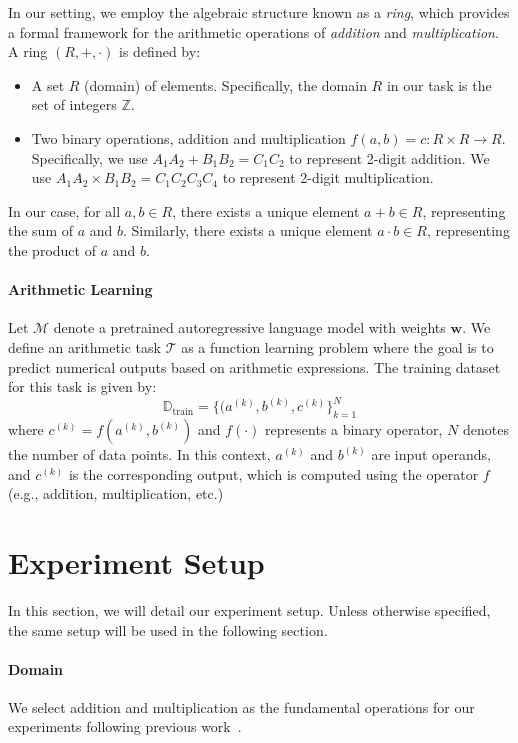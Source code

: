 \documentclass[11pt]{article}
\begin{document}
In our setting, we employ the algebraic structure known as a \textit{ring}, which provides a formal framework for the arithmetic operations of \textit{addition} and \textit{multiplication}. A ring $(R, +, \cdot)$ is defined by:

\begin{itemize}
    \item A set $R$ (domain) of elements. Specifically, the domain $R$ in our task is the set of integers $\mathbb{Z}$.
    \item Two binary operations, addition and multiplication $f(a,b)=c : R \times R \to R$. Specifically, we use $A_1A_2 + B_1B_2 = C_1C_2$ to represent 2-digit addition. We use $A_1A_2 \times B_1B_2 = C_1C_2C_3C_4$ to represent 2-digit multiplication.
\end{itemize}

In our case, for all $a, b \in R$, there exists a unique element $a + b \in R$, representing the sum of $a$ and $b$. Similarly, there exists a unique element $a \cdot b \in R$, representing the product of $a$ and $b$.


\paragraph{Arithmetic Learning}
\label{section:arithmetiC_learning_def}
Let $\mathcal{M}$ denote a pretrained autoregressive language model with weights $\mathbf{w}$. We define an arithmetic task $\mathcal{T}$ as a function learning problem where the goal is to predict numerical outputs based on arithmetic expressions. The training dataset for this task is given by:
\[
\mathbb{D}_{\text{train}} = \{(a^{(k)}, b^{(k)}, c^{(k)}\}_{k=1}^{N}
\]
where $c^{(k)} = f(a^{(k)}, b^{(k)})$ and $f(\cdot)$ represents a binary operator, $N$ denotes the number of data points. In this context, $a^{(k)}$ and $b^{(k)}$ are input operands, and $c^{(k)}$ is the corresponding output, which is computed using the operator $f$ (e.g., addition, multiplication, etc.)


\section{Experiment Setup}
In this section, we will detail our experiment setup. Unless otherwise specified, the same setup will be used in the following section.

\paragraph{Domain}
We select addition and multiplication as the fundamental operations for our experiments following previous work~\citep{lee2023teachingarithmeticsmalltransformers,deng2023implicitchainthoughtreasoning,deng2024explicitcotimplicitcot}.
\end{document}
